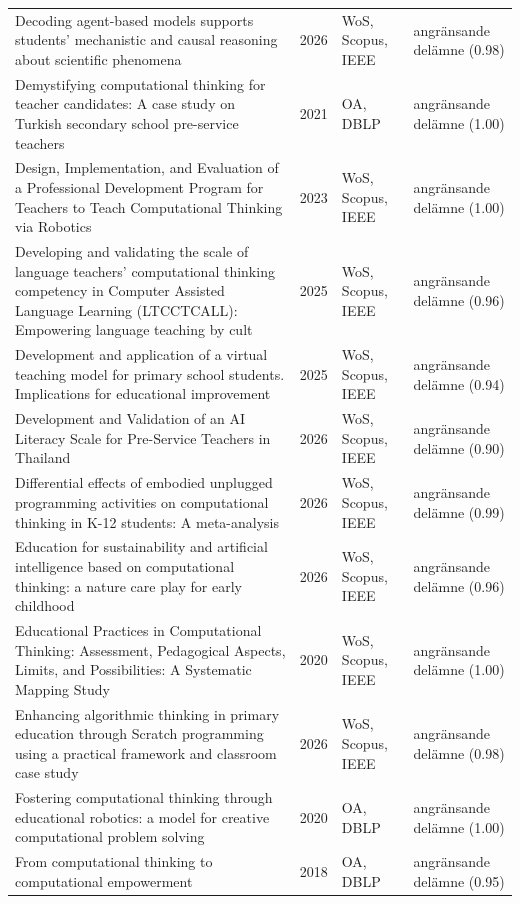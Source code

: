 \begin{longtable}{@{}%
  >{\raggedright\arraybackslash}p{}c%
  >{\raggedright\arraybackslash}p{}%
  >{\raggedright\arraybackslash}p{}@{}}
Decoding agent-based models supports students' mechanistic and causal reasoning about scientific phenomena & 2026 & WoS, Scopus, IEEE & angränsande delämne (0.98) \\
Demystifying computational thinking for teacher candidates: A case study on Turkish secondary school pre-service teachers & 2021 & OA, DBLP & angränsande delämne (1.00) \\
Design, Implementation, and Evaluation of a Professional Development Program for Teachers to Teach Computational Thinking via Robotics & 2023 & WoS, Scopus, IEEE & angränsande delämne (1.00) \\
Developing and validating the scale of language teachers' computational thinking competency in Computer Assisted Language Learning (LTCCTCALL): Empowering language teaching by cult & 2025 & WoS, Scopus, IEEE & angränsande delämne (0.96) \\
Development and application of a virtual teaching model for primary school students. Implications for educational improvement & 2025 & WoS, Scopus, IEEE & angränsande delämne (0.94) \\
Development and Validation of an AI Literacy Scale for Pre-Service Teachers in Thailand & 2026 & WoS, Scopus, IEEE & angränsande delämne (0.90) \\
Differential effects of embodied unplugged programming activities on computational thinking in K-12 students: A meta-analysis & 2026 & WoS, Scopus, IEEE & angränsande delämne (0.99) \\
Education for sustainability and artificial intelligence based on computational thinking: a nature care play for early childhood & 2026 & WoS, Scopus, IEEE & angränsande delämne (0.96) \\
Educational Practices in Computational Thinking: Assessment, Pedagogical Aspects, Limits, and Possibilities: A Systematic Mapping Study & 2020 & WoS, Scopus, IEEE & angränsande delämne (1.00) \\
Enhancing algorithmic thinking in primary education through Scratch programming using a practical framework and classroom case study & 2026 & WoS, Scopus, IEEE & angränsande delämne (0.98) \\
Fostering computational thinking through educational robotics: a model for creative computational problem solving & 2020 & OA, DBLP & angränsande delämne (1.00) \\
From computational thinking to computational empowerment & 2018 & OA, DBLP & angränsande delämne (0.95) \\

\end{longtable}
